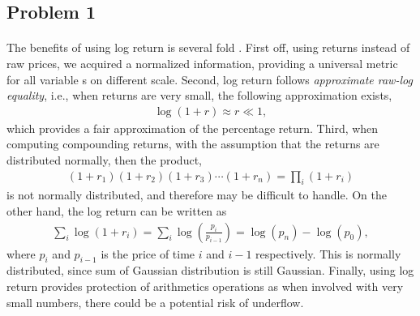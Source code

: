 \subsection*{Problem 1}
\paragraph{}
The benefits of using log return is several fold \cite{lr1, lr2}. First off, using returns instead of raw prices, we acquired a normalized information, providing a universal metric for all variable s on different scale. Second, log return follows \textit{approximate raw-log equality}, i.e., when returns are very small, the following approximation exists,
\begin{align*}
\log(1+r) \approx r \ll 1,
\end{align*}
which provides a fair approximation of the percentage return. Third, when computing compounding returns, with the assumption that the returns are distributed normally, then the product, 
\begin{align*}
(1+r_1)(1+r_2)(1+r_3)\cdots(1+r_n) = \prod_i(1+r_i)
\end{align*}
is not normally distributed, and therefore may be difficult to handle. On the other hand, the log return can be written as 
\begin{align*}
\sum_i \log(1+r_i) = \sum_i \log(\frac{p_i}{p_{i-1}}) = \log(p_n) - \log (p_0),
\end{align*}
where $p_i$ and $p_{i-1}$ is the price of time $i$ and $i-1$ respectively. This is normally distributed, since sum of Gaussian distribution is still Gaussian. Finally, using log return provides protection of arithmetics operations as when involved with very small numbers, there could be a potential risk of underflow.

